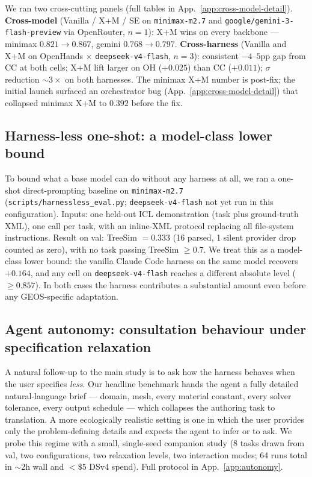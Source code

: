 \documentclass{article}
\begin{document}
We ran two cross-cutting panels (full tables in App.~\ref{app:cross-model-detail}). \textbf{Cross-model} (Vanilla / X+M / SE on \texttt{minimax-m2.7} and \texttt{google/gemini-3-flash-preview} via OpenRouter, $n=1$): X+M wins on every backbone --- minimax $0.821 \to 0.867$, gemini $0.768 \to 0.797$. \textbf{Cross-harness} (Vanilla and X+M on OpenHands × \texttt{deepseek-v4-flash}, $n=3$): consistent $-4$--$5$pp gap from CC at both cells; X+M lift larger on OH ($+0.025$) than CC ($+0.011$); $\sigma$ reduction ${\sim}3\times$ on both harnesses. The minimax X+M number is post-fix; the initial launch surfaced an orchestrator bug (App.~\ref{app:cross-model-detail}) that collapsed minimax X+M to $0.392$ before the fix.

\subsection{Harness-less one-shot: a model-class lower bound}
\label{subsec:harnessless}

To bound what a base model can do without any harness at all, we ran a one-shot direct-prompting baseline on \texttt{minimax-m2.7} (\texttt{scripts/harnessless\_eval.py}; \texttt{deepseek-v4-flash} not yet run in this configuration). Inputs: one held-out ICL demonstration (task plus ground-truth XML), one call per task, with an inline-XML protocol replacing all file-system instructions. Result on val: TreeSim $= 0.333$ (16 parsed, 1 silent provider drop counted as zero), with no task passing TreeSim $\geq 0.7$. We treat this as a model-class lower bound: the vanilla Claude Code harness on the same model recovers ${+}0.164$, and any cell on \texttt{deepseek-v4-flash} reaches a different absolute level ($\geq 0.857$). In both cases the harness contributes a substantial amount even before any GEOS-specific adaptation.

\subsection{Agent autonomy: consultation behaviour under specification relaxation}
\label{subsec:autonomy}

A natural follow-up to the main study is to ask how the harness behaves when the user specifies \emph{less}. Our headline benchmark hands the agent a fully detailed natural-language brief --- domain, mesh, every material constant, every solver tolerance, every output schedule --- which collapses the authoring task to translation. A more ecologically realistic setting is one in which the user provides only the problem-defining details and expects the agent to infer or to ask. We probe this regime with a small, single-seed companion study (8 tasks drawn from val, two configurations, two relaxation levels, two interaction modes; 64 runs total in $\sim$2h wall and ${<}\$5$ DSv4 spend). Full protocol in App.~\ref{app:autonomy}.
\end{document}
